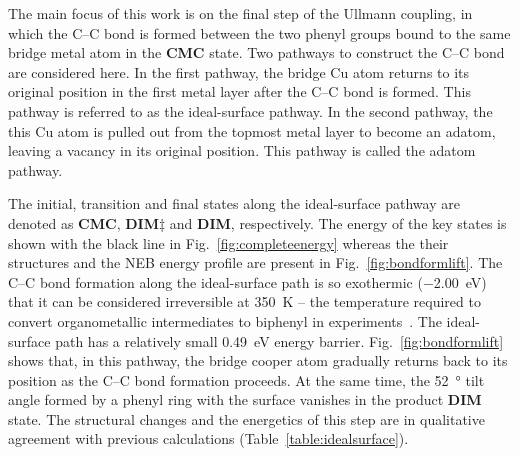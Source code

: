 \documentclass[%
 reprint,
 amsmath,amssymb,
 aps,
prb,
floatfix,
]{revtex4-2}
\newcommand{\lock}{\color{red}}
\newcommand{\lock}{\color{red}}
\begin{document}
{\lock
The main focus of this work is on the final step of the Ullmann coupling, in which the C--C bond is formed between the two phenyl groups bound to the same bridge metal atom in the \textbf{CMC} state. 
Two pathways to construct the C--C bond are considered here. 
In the first pathway, the bridge Cu atom returns to its original position in the first metal layer after the C--C bond is formed. This pathway is referred to as the ideal-surface pathway.
In the second pathway, the this Cu atom is pulled out from the topmost metal layer to become an adatom, leaving a vacancy in its original position. This pathway is called the adatom pathway.
}

{\lock
The initial, transition and final states along the ideal-surface pathway are denoted as \textbf{CMC}, \textbf{DIM$\ddagger$} and \textbf{DIM}, respectively.
The energy of the key states is shown with the black line in Fig.~\ref{fig:completeenergy} whereas the their structures and the NEB energy profile are present in Fig.~\ref{fig:bondformlift}. 
The C--C bond formation along the ideal-surface path is so exothermic (\SI{-2.00}{\electronvolt}) that it can be considered irreversible at \SI{350}{\kelvin} -- the temperature required to convert organometallic intermediates to biphenyl in experiments~\cite{ullmann_67, sur_sci01}. The ideal-surface path has a relatively small \SI{0.49}{\electronvolt} energy barrier. %
Fig.~\ref{fig:bondformlift} shows that, in this pathway, the bridge cooper atom gradually returns back to its position as the C--C bond formation proceeds. At the same time, the \SI{52}{\degree} tilt angle formed by a phenyl ring with the surface vanishes in the product \textbf{DIM} state.
% 
The structural changes and the energetics of this step are in qualitative agreement with previous calculations (Table~\ref{table:idealsurface}). %

}
\end{document}
